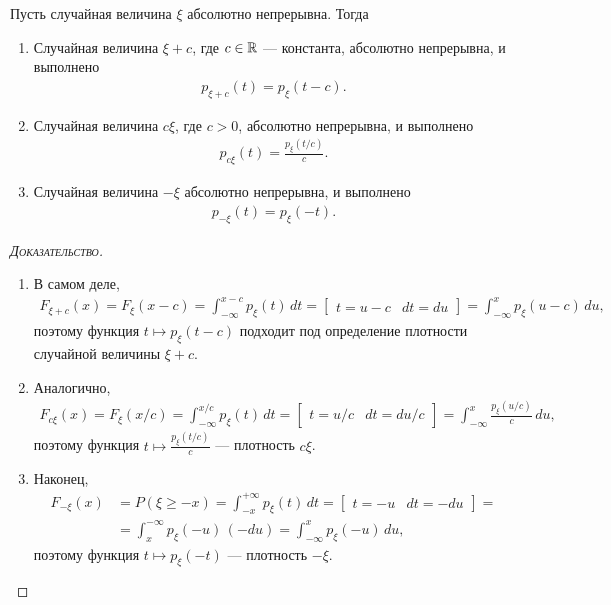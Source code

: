 \documentclass[../main.tex]{subfiles}
\begin{document}
\begin{prop}
 Пусть случайная величина $ \xi $ абсолютно непрерывна. Тогда
 \begin{enumerate}
  \item Случайная величина $ \xi + c $, где $ c \in \mathbb{R} $ --- константа, абсолютно непрерывна, и выполнено
   \begin{align*}
    p_{\xi + c}(t) = p_\xi(t - c).
   \end{align*}
  \item Случайная величина $ c\xi $, где $ c > 0 $, абсолютно непрерывна, и выполнено
   \begin{align*}
    p_{c\xi}(t) = \frac{p_\xi(t / c)}{c}.
   \end{align*}
  \item Случайная величина $ -\xi $ абсолютно непрерывна, и выполнено
   \begin{align*}
    p_{-\xi}(t) = p_\xi(-t).
   \end{align*}
 \end{enumerate}
\end{prop}
\begin{proof}[\normalfont\textsc{Доказательство}]\
 \begin{enumerate}
  \item В самом деле,
   \begin{align*}
    F_{\xi+c}(x) = F_\xi(x - c) = \int_{-\infty}^{x - c} p_\xi(t)\,dt = \begin{bmatrix}
     t = u - c & dt = du
    \end{bmatrix} = \int_{-\infty}^{x} p_\xi(u - c)\,du,
   \end{align*} поэтому функция $ t \mapsto p_\xi(t - c) $  подходит под определение плотности случайной величины $ \xi + c $.
  \item Аналогично,
   \begin{align*}
    F_{c\xi}(x) = F_{\xi}(x / c) = \int_{-\infty}^{x / c} p_\xi(t)\,dt = \begin{bmatrix}
     t = u / c & dt = du / c
    \end{bmatrix} = \int_{-\infty}^{x} \frac{p_\xi(u / c)}{c}\,du,
   \end{align*} поэтому функция $ t \mapsto \frac{p_\xi(t / c)}{c} $  --- плотность $ c\xi $.
  \item Наконец,
   \begin{align*}
    F_{-\xi}(x) &= P(\xi \geqslant -x) = \int_{-x}^{+\infty} p_\xi(t)\,dt = \begin{bmatrix}
     t = -u & dt = -du
    \end{bmatrix} = \\
    &= \int_{x}^{-\infty} p_\xi(-u)\,(-du) = \int_{-\infty}^{x} p_\xi(-u)\,du,
   \end{align*} поэтому функция $ t \mapsto p_\xi(-t) $ --- плотность $ -\xi $.
 \end{enumerate}
\end{proof}
\end{document}
